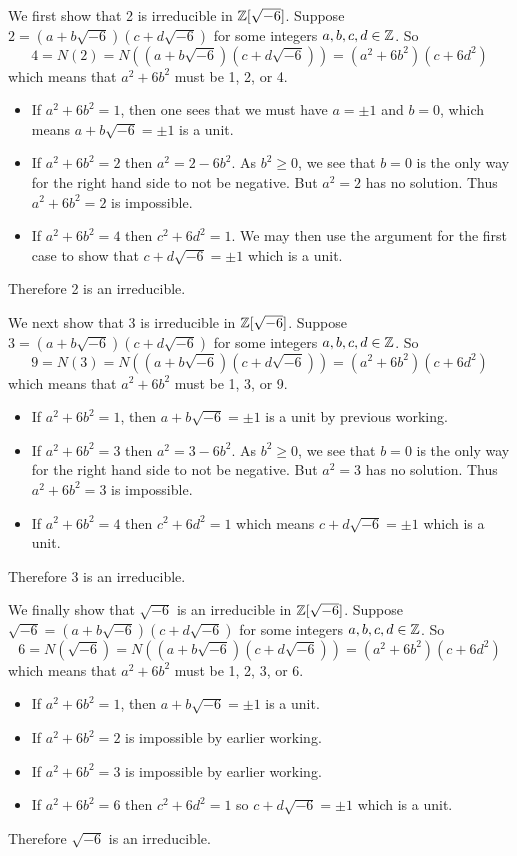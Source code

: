 \begin{questions}
    We first show that 2 is irreducible in $\mathbb{Z}[\sqrt{-6}]$. Suppose $2 = (a+b\sqrt{-6})(c+d\sqrt{-6})$ for some integers $a,b,c,d\in \mathbb{Z}$. So
    \[
        4 = N(2) = N\left((a+b\sqrt{-6})(c+d\sqrt{-6})\right) = (a^2+6b^2)(c+6d^2)
    \]
    which means that $a^2+6b^2$ must be 1, 2, or 4.
    \begin{itemize}
        \item If $a^2+6b^2 = 1$, then one sees that we must have $a = \pm1$ and $b = 0$, which means $a+b\sqrt{-6} = \pm1$ is a unit.
        \item If $a^2+6b^2 = 2$ then $a^2 = 2 - 6b^2$. As $b^2 \geq 0$, we see that $b = 0$ is the only way for the right hand side to not be negative. But $a^2 = 2$ has no solution. Thus $a^2+6b^2 = 2$ is impossible.
        \item If $a^2+6b^2 = 4$ then $c^2+6d^2 = 1$. We may then use the argument for the first case to show that $c+d\sqrt{-6} = \pm1$ which is a unit.
    \end{itemize}
    Therefore 2 is an irreducible.

    We next show that 3 is irreducible in $\mathbb{Z}[\sqrt{-6}]$. Suppose $3 = (a+b\sqrt{-6})(c+d\sqrt{-6})$ for some integers $a,b,c,d\in \mathbb{Z}$. So
    \[
        9 = N(3) = N\left((a+b\sqrt{-6})(c+d\sqrt{-6})\right) = (a^2+6b^2)(c+6d^2)
    \]
    which means that $a^2+6b^2$ must be 1, 3, or 9.
    \begin{itemize}
        \item If $a^2+6b^2 = 1$, then $a+b\sqrt{-6} = \pm1$ is a unit by previous working.
        \item If $a^2+6b^2 = 3$ then $a^2 = 3 - 6b^2$. As $b^2 \geq 0$, we see that $b = 0$ is the only way for the right hand side to not be negative. But $a^2 = 3$ has no solution. Thus $a^2+6b^2 = 3$ is impossible.
        \item If $a^2+6b^2 = 4$ then $c^2+6d^2 = 1$ which means $c+d\sqrt{-6} = \pm1$ which is a unit.
    \end{itemize}
    Therefore 3 is an irreducible.

    We finally show that $\sqrt{-6}$ is an irreducible in $\mathbb{Z}[\sqrt{-6}]$. Suppose $\sqrt{-6} = (a+b\sqrt{-6})(c+d\sqrt{-6})$ for some integers $a,b,c,d\in \mathbb{Z}$. So
    \[
        6 = N(\sqrt{-6}) = N\left((a+b\sqrt{-6})(c+d\sqrt{-6})\right) = (a^2+6b^2)(c+6d^2)
    \]
    which means that $a^2+6b^2$ must be 1, 2, 3, or 6.
    \begin{itemize}
        \item If $a^2+6b^2 = 1$, then $a+b\sqrt{-6} = \pm1$ is a unit.
        \item If $a^2+6b^2 = 2$ is impossible by earlier working.
        \item If $a^2+6b^2 = 3$ is impossible by earlier working.
        \item If $a^2+6b^2 = 6$ then $c^2+6d^2 = 1$ so $c+d\sqrt{-6} = \pm1$ which is a unit.
    \end{itemize}
    Therefore $\sqrt{-6}$ is an irreducible.


\end{questions}
